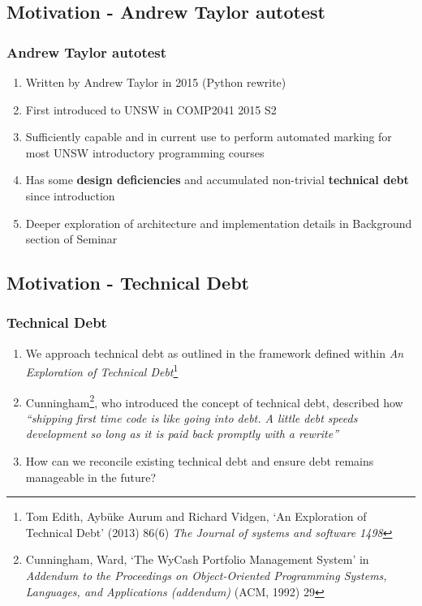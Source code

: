 \documentclass[xcolor]{beamer}
\begin{document}
\subsection{Motivation - Andrew Taylor autotest}
\begin{frame}
	\frametitle{Andrew Taylor autotest}
	\begin{enumerate}
		\setlength\itemsep{1em}
		\item Written by Andrew Taylor in 2015 (Python rewrite)
			\pause
		\item First introduced to UNSW in COMP2041 2015 S2
			\pause
		\item Sufficiently capable and in current use to perform automated marking for most UNSW introductory programming courses
			\pause
		\item Has some \textbf{design deficiencies} and accumulated non-trivial \textbf{technical debt} since introduction
			\pause
		\item Deeper exploration of architecture and implementation details in Background section of Seminar
	\end{enumerate}
\end{frame}

\subsection{Motivation - Technical Debt}
\begin{frame}
	\frametitle{Technical Debt}
	\begin{enumerate}
		\setlength\itemsep{1em}
		\item We approach technical debt as outlined in the framework defined within \textit{An Exploration of Technical Debt}\footnote{Tom Edith, Aybüke Aurum and Richard Vidgen, ‘An Exploration of Technical Debt’ (2013) 86(6) \textit{The Journal of systems and software 1498}}
			\pause
		\item Cunningham\footnote{Cunningham, Ward, ‘The WyCash Portfolio Management System’ in \textit{Addendum to the Proceedings on Object-Oriented Programming Systems, Languages, and Applications (addendum)} (ACM, 1992) 29}, who introduced the concept of technical debt, described how \textit{“shipping first time code is like going into debt. A little debt speeds development so long as it is paid back promptly with a rewrite”}
			\pause
		\item How can we reconcile existing technical debt and ensure debt remains manageable in the future?
	\end{enumerate}
\end{frame}
\end{document}

